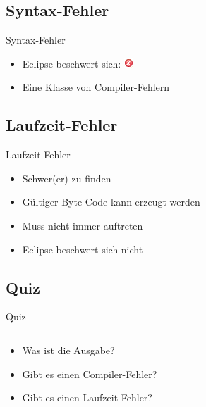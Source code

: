 \documentclass[usepdftitle=false,hyperref={pdfpagelabels=false}]{beamer}
\begin{document}
\subsection{Syntax-Fehler}
\begin{frame}{Syntax-Fehler}
    \begin{itemize}[<+->]
        \item Eclipse beschwert sich: \includegraphics{syntax-error.png}
        \item Eine Klasse von Compiler-Fehlern
    \end{itemize}
\end{frame}

\subsection{Laufzeit-Fehler}
\begin{frame}{Laufzeit-Fehler}
    \begin{itemize}[<+->]
        \item Schwer(er) zu finden
        \item Gültiger Byte-Code kann erzeugt werden
        \item Muss nicht immer auftreten
        \item Eclipse beschwert sich nicht
    \end{itemize}
\end{frame}

\subsection{Quiz}
\begin{frame}{Quiz}
    \inputminted[linenos, numbersep=5pt, tabsize=4, frame=lines, label=Bool.java, fontsize=\tiny]{java}{Bool-02.java}
    \begin{itemize}
        \item Was ist die Ausgabe?
        \item Gibt es einen Compiler-Fehler?
        \item Gibt es einen Laufzeit-Fehler?
    \end{itemize}
\end{frame}
\end{document}
